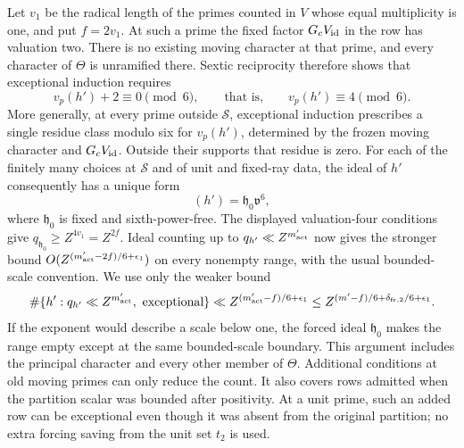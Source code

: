 \documentclass[11pt,a4paper]{article}
\numberwithin{equation}{section}
\numberwithin{figure}{section}
\theoremstyle{definition}
\theoremstyle{remark}
\begin{document}
Let \(v_1\) be the radical length of the primes counted in \(V\)
whose equal multiplicity is one, and put \(f=2v_1\).  At such a
prime the fixed factor \(G_cV_{\rm id}\) in the row has valuation
two.  There is no existing moving character at that prime, and
every character of \(\Theta\) is unramified there.  Sextic
reciprocity therefore shows that exceptional induction requires
\[
 v_p(h')+2\equiv0\pmod6,\qquad\text{that is,}\qquad
 v_p(h')\equiv4\pmod6.
\]
More generally, at every prime outside \(\mathcal S\), exceptional
induction prescribes a single residue class modulo six for
\(v_p(h')\), determined by the frozen moving character and
\(G_cV_{\rm id}\).  Outside their supports that residue is zero.
For each of the finitely many choices at \(\mathcal S\) and of
unit and fixed-ray data, the ideal of \(h'\) consequently has a
unique form
\[
 (h')=\mathfrak h_0\mathfrak v^6,
\]
where \(\mathfrak h_0\) is fixed and sixth-power-free.  The
displayed valuation-four conditions give
\(q_{\mathfrak h_0}\ge Z^{4v_1}=Z^{2f}\).
Ideal counting up to \(q_{h'}\ll Z^{m'_{\rm act}}\) now gives the
stronger bound \(O(Z^{(m'_{\rm act}-2f)/6+\epsilon_1})\) on every
nonempty range, with the usual bounded-scale convention.  We use
only the weaker bound
\begin{equation}
 \#\{h':q_{h'}\ll Z^{m'_{\rm act}},\ \text{exceptional}\}
 \ll Z^{(m'_{\rm act}-f)/6+\epsilon_1}
 \le Z^{(m'-f)/6+\delta_{{\rm fr},2}/6+\epsilon_1}.
 \label{eq:exceptional-row-count}
\end{equation}
If the exponent would describe a scale below one, the forced ideal
\(\mathfrak h_0\) makes the range empty except at the same
bounded-scale boundary.  This argument includes the principal
character and every other member of \(\Theta\).  Additional
conditions at old moving primes can only reduce the count.
It also covers rows admitted when the partition scalar was bounded
after positivity.  At a unit prime, such an added row can be
exceptional even though it was absent from the original partition;
no extra forcing saving from the unit set \(t_2\) is used.
\end{document}
